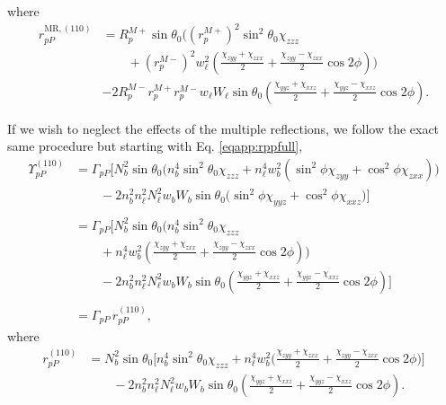 where
\begin{equation}\label{eqapp:final-rpp.mr.110}
\begin{split}
r^{\mathrm{MR},(110)}_{pP} &=
R^{M+}_{p}\sin\theta_{0}
\bigg(
\left(r^{M+}_{p}\right)^{2}\sin^{2}\theta_{0}\chi_{zzz}\\
&\qquad+ \left(r^{M-}_{p}\right)^{2}w^{2}_{\ell}
\left(
\frac{\chi_{zyy} + \chi_{zxx}}{2} + \frac{\chi_{zyy} - \chi_{zxx}}{2}\cos2\phi
\right)
\bigg)\\
&- 2R^{M-}_{p}r^{M+}_{p}r^{M-}_{p}w_{\ell}W_{\ell}\sin\theta_{0}
\left(
\frac{\chi_{yyz} + \chi_{xxz}}{2} + \frac{\chi_{yyz} - \chi_{xxz}}{2}\cos2\phi
\right).
\end{split}
\end{equation}

If we wish to neglect the effects of the multiple reflections, we follow the
exact same procedure but starting with Eq. \eqref{eqapp:rppfull},
\begin{equation*}
\begin{split}
\Upsilon^{(110)}_{pP} &=
\Gamma_{pP}
\bigg[
N^{2}_{b}\sin\theta_{0}
\bigg(
n^{4}_{b}\sin^{2}\theta_{0}\chi_{zzz}
+ n^{4}_{\ell}w^{2}_{b}(\sin^{2}\phi\chi_{zyy} + \cos^{2}\phi\chi_{zxx})
\bigg)\\
&\qquad- 2n^{2}_{b}n^{2}_{\ell}N^{2}_{\ell}w_{b}W_{b}\sin\theta_{0}
\big(
\sin^{2}\phi\chi_{yyz} + \cos^{2}\phi\chi_{xxz}
\big)
\bigg]\\\\
&=
\Gamma_{pP}
\bigg[
N^{2}_{b}\sin\theta_{0}
\bigg(
n^{4}_{b}\sin^{2}\theta_{0}\chi_{zzz}\\
&\qquad+ n^{4}_{\ell}w^{2}_{b}
\left(
\frac{\chi_{zyy} + \chi_{zxx}}{2} + \frac{\chi_{zyy} - \chi_{zxx}}{2}\cos2\phi
\right)
\bigg)\\
&\qquad- 2n^{2}_{b}n^{2}_{\ell}N^{2}_{\ell}w_{b}W_{b}\sin\theta_{0}
\left(
\frac{\chi_{yyz} + \chi_{xxz}}{2} + \frac{\chi_{yyz} - \chi_{xxz}}{2}\cos2\phi
\right)
\bigg]\\\\
&= \Gamma_{pP}\,r^{(110)}_{pP},
\end{split}
\end{equation*}
where
\begin{equation}\label{eqapp:final-rpp.110}
\begin{split}
r^{(110)}_{pP} &= 
N^{2}_{b}\sin\theta_{0}
\bigg[
n^{4}_{b}\sin^{2}\theta_{0}\chi_{zzz}
+ n^{4}_{\ell}w^{2}_{b}
\bigg(
\frac{\chi_{zyy} + \chi_{zxx}}{2} + \frac{\chi_{zyy} - \chi_{zxx}}{2}\cos2\phi
\bigg)
\bigg]\\
&\qquad- 2n^{2}_{b}n^{2}_{\ell}N^{2}_{\ell}w_{b}W_{b}\sin\theta_{0}
\left(
\frac{\chi_{yyz} + \chi_{xxz}}{2} + \frac{\chi_{yyz} - \chi_{xxz}}{2}\cos2\phi
\right).
\end{split}
\end{equation}


